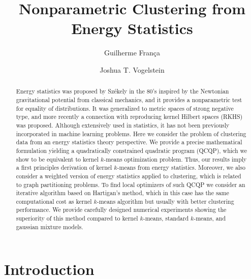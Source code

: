 \documentclass[aps,preprint,nofootinbib,floatfix]{revtex4-1}
\begin{document}
\title{Nonparametric Clustering from  Energy Statistics}

\author{Guilherme Fran\c ca}

\author{Joshua T. Vogelstein}



\begin{abstract}
Energy statistics 
was proposed by 
Sz\' ekely in the 80's
inspired by the Newtonian gravitational potential from classical mechanics,
and it provides a nonparametric test for equality of distributions.
It was generalized to 
metric spaces of strong negative type,
and more recently a connection with reproducing kernel Hilbert spaces (RKHS)
was proposed.
Although  
extensively used in statistics, it
has not been previously incorporated in machine learning problems.
Here we consider the problem of clustering data from
an energy statistics theory perspective.
We provide a precise mathematical formulation yielding
a quadratically constrained quadratic program (QCQP), which we show
to be equivalent
to kernel $k$-means optimization problem.
Thus, our results imply a first principles derivation of 
kernel $k$-means from energy statistics.
Moreover, we also consider a weighted version of energy statistics 
applied to clustering, which is related to 
graph partitioning problems.
To find local optimizers of such QCQP we consider an iterative
algorithm based on Hartigan's method, which in this case
has the same computational cost 
as kernel $k$-means algorithm but usually with better clustering
performance. We provide carefully designed numerical experiments
showing the superiority of this method compared to
kernel $k$-means, standard $k$-means, and gaussian mixture models.
\end{abstract}

\maketitle

\section{Introduction}
\end{document}
